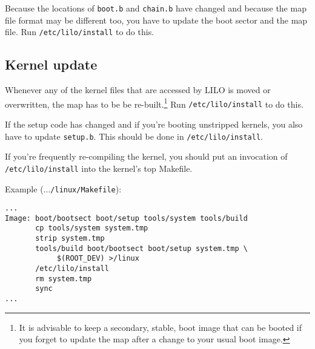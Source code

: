 Because the locations of {\tt boot.b} and {\tt chain.b} have changed
and because the map file format may be different too, you have to update
the boot sector and the map file. Run {\tt /etc/lilo/install} to do this.


\subsection{Kernel update}

Whenever any of the kernel files that are accessed by LILO is moved or
overwritten, the map has to be be re-built.\footnote{It is advisable to
keep a secondary, stable, boot image that can be booted if you forget
to update the map after a change to your usual boot image.} Run
{\tt /etc/lilo/install} to do this.

If the setup code has changed and if you're booting unstripped kernels,
you also have to update {\tt setup.b}. This should be done in
{\tt /etc/lilo/install}.

If you're frequently re-compiling the kernel, you should put an invocation of
{\tt /etc/lilo/install} into the kernel's top Makefile.

Example ({\tt $\ldots$/linux/Makefile}):

\begin{verbatim}
...
Image: boot/bootsect boot/setup tools/system tools/build
       cp tools/system system.tmp
       strip system.tmp
       tools/build boot/bootsect boot/setup system.tmp \
            $(ROOT_DEV) >/linux
       /etc/lilo/install
       rm system.tmp
       sync
...
\end{verbatim}



